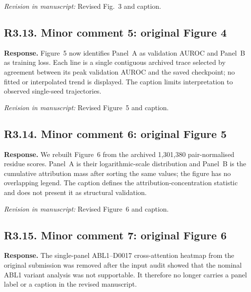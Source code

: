\documentclass[11pt,a4paper]{article}
\newcommand{\response}{\noindent\textbf{Response.} }
\newcommand{\change}[1]{\par\smallskip\noindent\textit{Revision in manuscript:} #1\par\medskip}
\begin{document}
\change{Revised Fig.~3 and caption.}

\subsection*{R3.13. Minor comment 5: original Figure 4}


\response Figure~5 now identifies Panel~A as validation AUROC and Panel~B as
training loss. Each line is a single contiguous archived trace selected by
agreement between its peak validation AUROC and the saved checkpoint; no fitted
or interpolated trend is displayed. The caption limits interpretation to
observed single-seed trajectories.

\change{Revised Figure~5 and caption.}

\subsection*{R3.14. Minor comment 6: original Figure 5}


\response We rebuilt Figure~6 from the archived 1,301,380 pair-normalised
residue scores. Panel~A is their logarithmic-scale distribution and Panel~B is
the cumulative attribution mass after sorting the same values; the figure has no
overlapping legend. The caption defines the attribution-concentration statistic
and does not present it as structural validation.

\change{Revised Figure~6 and caption.}

\subsection*{R3.15. Minor comment 7: original Figure 6}


\response The single-panel ABL1--D0017 cross-attention heatmap from the original
submission was removed after the input audit showed that the nominal ABL1 variant
analysis was not supportable. It therefore no longer carries a panel label or a
caption in the revised manuscript.
\end{document}
